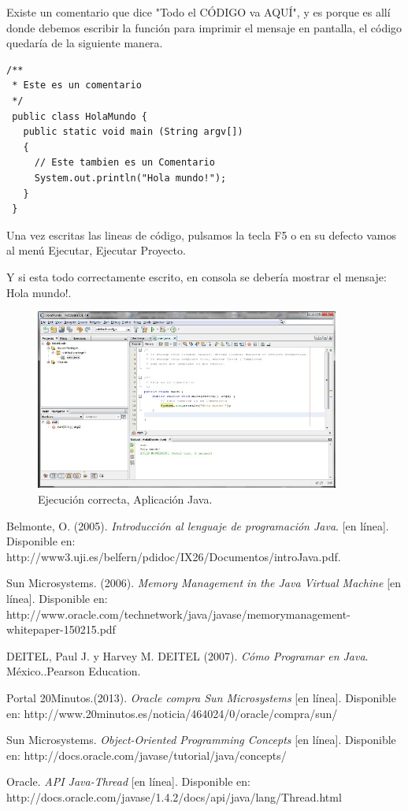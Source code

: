 \documentclass[12pt]{book} %
\begin{document}
Existe un comentario que dice "Todo el CÓDIGO va AQUÍ", y es porque es allí donde debemos escribir la función para imprimir el mensaje en pantalla, el código quedaría de la siguiente manera.

\noindent
%
\begin{lstlisting}[frame=single]
/**
 * Este es un comentario
 */
 public class HolaMundo {
   public static void main (String argv[])
   {
     // Este tambien es un Comentario
     System.out.println("Hola mundo!");
   }
 }
\end{lstlisting}

Una vez escritas las lineas de código, pulsamos la tecla F5 o en su defecto vamos al menú Ejecutar, Ejecutar Proyecto.

Y si esta todo correctamente escrito, en consola se debería mostrar el mensaje: Hola mundo!.

	\begin{figure}[h]
		\centering
			\includegraphics[width=10cm]{Hola_mundo_004.jpg}
			\caption{Ejecución correcta, Aplicación Java.}
		
	\end{figure}
	
\begin{thebibliography}{99}
 Belmonte, O. (2005). \textsl{Introducción al lenguaje de programación Java}. [en línea]. Disponible en: http://www3.uji.es/belfern/pdidoc/IX26/Documentos/introJava.pdf.

 Sun Microsystems. (2006). \textsl{Memory Management in the Java Virtual Machine} [en línea]. Disponible en: http://www.oracle.com/technetwork/java/javase/memorymanagement-whitepaper-150215.pdf

\bibitem DEITEL, Paul J. y Harvey M. DEITEL (2007). \textsl{Cómo Programar en Java}. México..Pearson Education. 

\bibitem Portal 20Minutos.(2013). \textsl{Oracle compra Sun Microsystems} [en línea]. Disponible en: http://www.20minutos.es/noticia/464024/0/oracle/compra/sun/

 Sun Microsystems. \textsl{Object-Oriented Programming Concepts} [en línea]. Disponible en: http://docs.oracle.com/javase/tutorial/java/concepts/

 Oracle. \textsl{API Java-Thread} [en línea]. Disponible en: http://docs.oracle.com/javase/1.4.2/docs/api/java/lang/Thread.html

\end{thebibliography}
\end{document}
